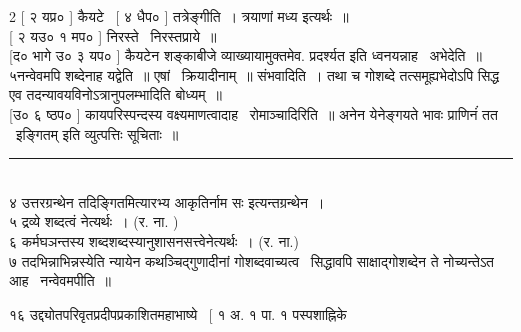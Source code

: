 \documentclass[11pt, openany]{book}
\makeatletter
\newcommand{\devanagarinumeral}[1]{
\devanagaridigits{\number \csname c@#1\endcsname}} %
\makeatother
\begin{document}
\begin{multicols}{2}
[ २ यप्र० ] कैयटे \textendash\ [ ४ धैप० ] तत्रेङ्गीति~। त्रयाणां मध्य इत्यर्थः~॥\\

[ २ यउ० १ मप० ] निरस्ते \textendash\ निरस्तप्राये~॥\\

[द० भागे उ० ३ यप० ] कैयटेन शङ्काबीजे व्याख्यायामुक्तमेव. प्रदर्श्यत इति ध्वनयन्नाह \textendash\ अभेदेति~॥ ५नन्वेवमपि शब्देनाह यद्वेति~॥ एषां \textendash\ क्रियादीनाम्~॥ संभवादिति~। तथा च गोशब्दे तत्समूह्यभेदोऽपि सिद्ध एव तदन्यावयविनोऽत्रानुपलम्भादिति बोध्यम्~॥\\

[उ० ६ ष्ठप० ] कायपरिस्पन्दस्य वक्ष्यमाणत्वादाह \textendash\ रोमाञ्चादिरिति~॥ अनेन येनेङ्गयते भावः प्राणिनंं तत \textendash\ इङ्गितम् इति व्युत्पत्तिः सूचिताः~॥

\noindent
\rule{1\linewidth}{0.5pt}\\

४ उत्तरग्रन्थेन तदिङ्गितमित्यारभ्य आकृतिर्नाम सः इत्यन्तग्रन्थेन~।\\

५ द्रव्ये शब्दत्वं नेत्यर्थः~। (र. ना. )\\

६ कर्मघञन्तस्य शब्दशब्दस्यानुशासनसत्त्वेनेत्यर्थः~। (र. ना.)\\

७ तदभिन्नाभिन्नस्येति न्यायेन कथञ्चिद्गुणादीनां गोशब्दवाच्यत्व \textendash\  सिद्धावपि साक्षाद्गोशब्देन ते नोच्यन्तेऽत आह \textendash\ नन्वेवमपीति~॥
\end{multicols}

\fancyhead[RE]{[ १ अ. १ पा. १ पस्पशाह्रिकै}
\fancyhead[LO]{शास्त्रप्रयोजनाधिकरणम् ]}
\fancyhead[LE,RO]{\thepage}
\cfoot{}
\newpage
\renewcommand{\thepage}{\devanagarinumeral{page}}
\setcounter{page}{16}

१६ उद्द्योतपरिवृतप्रदीपप्रकाशितमहाभाष्ये \textendash\ [ १ अ. १ पा. १ पस्पशाह्निके
\end{document}
